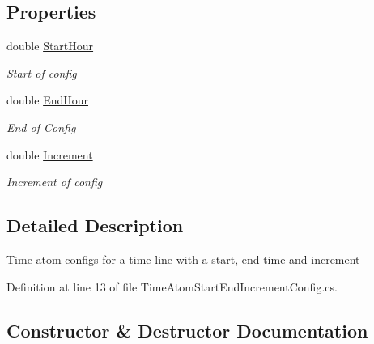 \subsection*{Properties}
\begin{DoxyCompactItemize}
\item 
double \hyperlink{class_general_health_care_elements_1_1_booking_models_1_1_time_atom_start_end_increment_config_a01fd2d9ff3be8aba83d87474d3a075a2}{Start\+Hour}
\begin{DoxyCompactList}\small\item\em Start of config \end{DoxyCompactList}\item 
double \hyperlink{class_general_health_care_elements_1_1_booking_models_1_1_time_atom_start_end_increment_config_a9a42e179977588d655837a80cd962afa}{End\+Hour}
\begin{DoxyCompactList}\small\item\em End of Config \end{DoxyCompactList}\item 
double \hyperlink{class_general_health_care_elements_1_1_booking_models_1_1_time_atom_start_end_increment_config_aa4cf3f3118c9d539ee7d25827bb5a040}{Increment}
\begin{DoxyCompactList}\small\item\em Increment of config \end{DoxyCompactList}\end{DoxyCompactItemize}


\subsection{Detailed Description}
Time atom configs for a time line with a start, end time and increment 



Definition at line 13 of file Time\+Atom\+Start\+End\+Increment\+Config.\+cs.



\subsection{Constructor \& Destructor Documentation}
